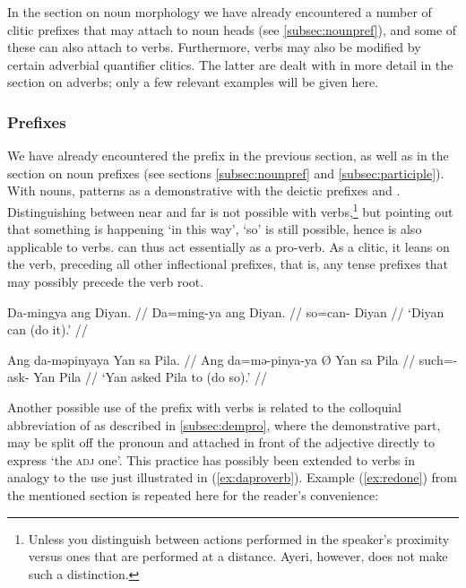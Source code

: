 In the section on noun morphology we have already encountered a number of 
clitic prefixes that may attach to noun heads (see \autoref{subsec:nounpref}), 
and some of these can also attach to verbs. Furthermore, verbs may also be 
modified by certain adverbial quantifier clitics. The latter are dealt with in 
more detail in the section on adverbs; only a few relevant examples will be 
given here.

\subsubsection{Prefixes}

We have already encountered the prefix  in the previous 
section, as well as in the section on noun prefixes (see sections
\ref{subsec:nounpref} and \ref{subsec:participle}). With nouns, 
 patterns as a demonstrative with the deictic prefixes 
 and . Distinguishing between near 
and far is not possible with verbs,\footnote{Unless you distinguish between 
actions performed in the speaker's proximity versus ones that are performed at 
a distance. Ayeri, however, does not make such a distinction.} but pointing out 
that something is happening `in this way', `so' is still possible, hence 
 is also applicable to verbs.  can thus act 
essentially as a pro-verb. As a clitic, it leans on the verb, preceding all 
other inflectional prefixes, that is, any tense prefixes that may possibly 
precede the verb root.

\pex\label{ex:daproverb}
\a\begingl
	\gla Da-mingya ang Diyan. //
	\glb Da=ming-ya ang Diyan. //
	\glc so=can-\TsgM{} \Aarg{} Diyan //
	\glft `Diyan can (do it).' //
\endgl

\a\begingl
	\gla Ang da-məpinyaya {} Yan sa Pila. //
	\glb Ang da=mə-pinya-ya Ø Yan sa Pila //
	\glc \AgtT{} such=\Pst{}-ask-\TsgM{} \Top{} Yan \Parg{} Pila //
	\glft `Yan asked Pila to (do so).' //
\endgl

\xe

Another possible use of the prefix  with verbs is related to the 
colloquial abbreviation of  as described in 
\autoref{subsec:dempro}, where the demonstrative part,  may be 
split off the pronoun and attached in front of the adjective directly to 
express `the \textsc{adj} one'. This practice has possibly been extended to 
verbs in analogy to the use just illustrated in (\ref{ex:daproverb}). Example 
(\ref{ex:redone}) from the mentioned section is repeated here for the reader's 
convenience:

